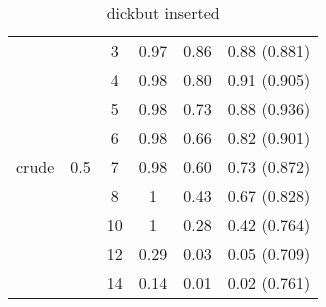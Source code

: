 \begin{table}[]
{\begin{tabular}{| c | c | c | c | c | c | }
		
		&& 3 & 0.97 & 0.86 &  0.88  (0.881)  \\ 
		&& 4 & 0.98 & 0.80 & 0.91  (0.905)   \\ 
		 && 5 & 0.98 & 0.73 &  0.88 (0.936)   \\ 
		&& 6 & 0.98 & 0.66 &  0.82  (0.901)  \\
		crude&0.5& 7 & 0.98 & 0.60 &  0.73 (0.872)  \\
		&& 8 & 1 & 0.43 &  0.67   (0.828) \\ 
		&& 10 & 1 & 0.28 &  0.42   (0.764) \\ 
		&& 12 & 0.29 & 0.03 &  0.05   (0.709) \\ 
		&& 14 & 0.14 & 0.01 &  0.02   (0.761) \\ \hline 
		
		
		
	\end{tabular}
	}
	\caption{dickbut inserted}
\end{table} %




